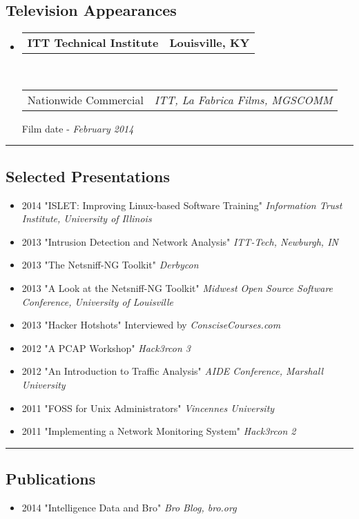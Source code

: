 \documentclass[10pt,letterpaper]{article}
\makeatletter
\newcommand{\headerrow}[2]
{\begin{tabular*}{\linewidth}{l@{\extracolsep{\fill}}r}
	#1 &
	#2 \\
\end{tabular*}}
\makeatother
\begin{document}
\subsection*{Television Appearances}

\begin{itemize}
	\parskip=0.1em

	\item
	\headerrow
		{\textbf{ITT Technical Institute}}
		{\textbf{Louisville, KY}}
	\\
	\headerrow
		{Nationwide Commercial}
		{\emph{ITT, La Fabrica Films, MGSCOMM}}
		{Film date - \emph{February 2014}}
\end{itemize}

\hrule
\vspace{-0.4em}
\subsection*{Selected Presentations}

\begin{itemize}
	\item \textsc{2014} "ISLET: Improving Linux-based Software Training" \textit{Information Trust Institute, University of Illinois}
	\item \textsc{2013} "Intrusion Detection and Network Analysis" \textit{ITT-Tech, Newburgh, IN}
	\item \textsc{2013} "The Netsniff-NG Toolkit" \textit{Derbycon}
	\item \textsc{2013} "A Look at the Netsniff-NG Toolkit" \textit{Midwest Open Source Software Conference, University of Louisville}
	\item \textsc{2013} "Hacker Hotshots" Interviewed by \textit{ConsciseCourses.com}
	\item \textsc{2012} "A PCAP Workshop" \textit{Hack3rcon 3}
	\item \textsc{2012} "An Introduction to Traffic Analysis" \textit{AIDE Conference, Marshall University}
	\item \textsc{2011} "FOSS for Unix Administrators" \textit{Vincennes University}
	\item \textsc{2011} "Implementing a Network Monitoring System" \textit{Hack3rcon 2}
\end{itemize}

\hrule
\vspace{-0.4em}
\subsection*{Publications}
\begin{itemize}
	\parskip=0.1em
	\item \textsc{2014} "Intelligence Data and Bro" \textit{Bro Blog, bro.org}
\end{itemize}
\end{document}
